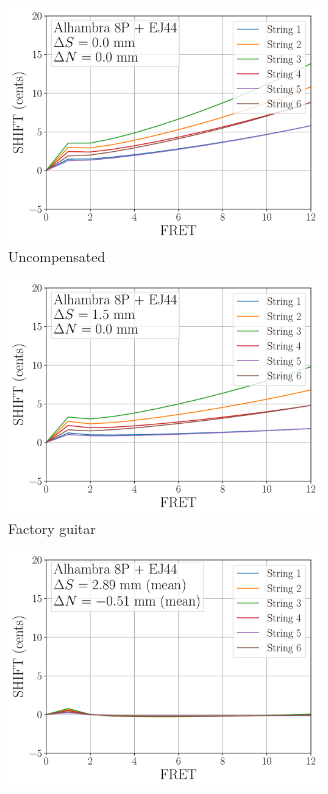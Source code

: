  \begin{figure}
  \centering
  \begin{subfigure}[b]{0.45\textwidth}
   \centering
   \includegraphics[width=3.25in]{figures/shift_alhambra8p_ej44_null}
   \caption{Uncompensated}
   \label{fig:shift_alhambra8p_ej44_null}
  \end{subfigure}
  \hspace{0.25in}
  \begin{subfigure}[b]{0.45\textwidth}
   \centering
   \includegraphics[width=3.25in]{figures/shift_alhambra8p_ej44_factory}
   \caption{Factory guitar}
   \label{fig:shift_alhambra8p_ej44_factory}
  \end{subfigure}
  \par\vspace{0.25in}
  \begin{subfigure}[b]{0.45\textwidth}
   \centering
   \includegraphics[width=3.25in]{figures/shift_alhambra8p_ej44_full}

\end{subfigure}
\end{figure}
